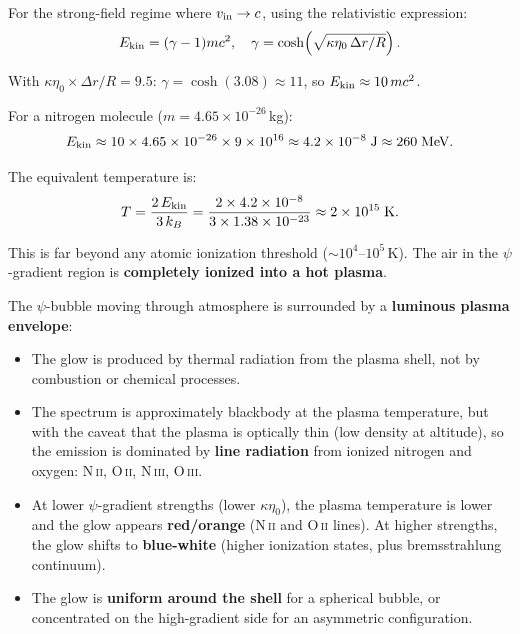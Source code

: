 \documentclass[11pt]{article}
\begin{document}
For the strong-field regime where $v_{\rm in} \to c$, using the
relativistic expression:
\begin{equation}
E_{\rm kin} = (\gamma - 1)m c^2, \quad
\gamma = \cosh\!\left(\sqrt{\kappa\eta_0\,\Delta r/R}\right).
\end{equation}

With $\kappa\eta_0 \times \Delta r/R = 9.5$:
$\gamma = \cosh(3.08) \approx 11$, so $E_{\rm kin} \approx 10\,mc^2$.

For a nitrogen molecule ($m = 4.65 \times 10^{-26}$\,kg):
\begin{equation}
E_{\rm kin} \approx 10 \times 4.65 \times 10^{-26} \times 9 \times 10^{16}
  \approx 4.2 \times 10^{-8}\;\text{J}
  \approx 260\;\text{MeV}.
\end{equation}

The equivalent temperature is:
\begin{equation}
T = \frac{2\,E_{\rm kin}}{3\,k_B}
  = \frac{2 \times 4.2 \times 10^{-8}}{3 \times 1.38 \times 10^{-23}}
  \approx 2 \times 10^{15}\;\text{K}.
\end{equation}

This is far beyond any atomic ionization threshold ($\sim 10^4$--$10^5$\,K).
The air in the $\psi$-gradient region is \textbf{completely ionized into
a hot plasma}.

\begin{tcolorbox}[colback=orange!5,colframe=orange!50!black,title=Atmospheric Glow Prediction]
The $\psi$-bubble moving through atmosphere is surrounded by a
\textbf{luminous plasma envelope}:
\begin{itemize}[noitemsep]
\item The glow is produced by thermal radiation from the plasma shell,
  not by combustion or chemical processes.
\item The spectrum is approximately blackbody at the plasma temperature,
  but with the caveat that the plasma is optically thin (low density at
  altitude), so the emission is dominated by \textbf{line radiation}
  from ionized nitrogen and oxygen: N\,\textsc{ii}, O\,\textsc{ii},
  N\,\textsc{iii}, O\,\textsc{iii}.
\item At lower $\psi$-gradient strengths (lower $\kappa\eta_0$), the
  plasma temperature is lower and the glow appears \textbf{red/orange}
  (N\,\textsc{ii} and O\,\textsc{ii} lines). At higher strengths, the
  glow shifts to \textbf{blue-white} (higher ionization states, plus
  bremsstrahlung continuum).
\item The glow is \textbf{uniform around the shell} for a spherical
  bubble, or concentrated on the high-gradient side for an asymmetric
  configuration.
\end{itemize}
\end{tcolorbox}
\end{document}
